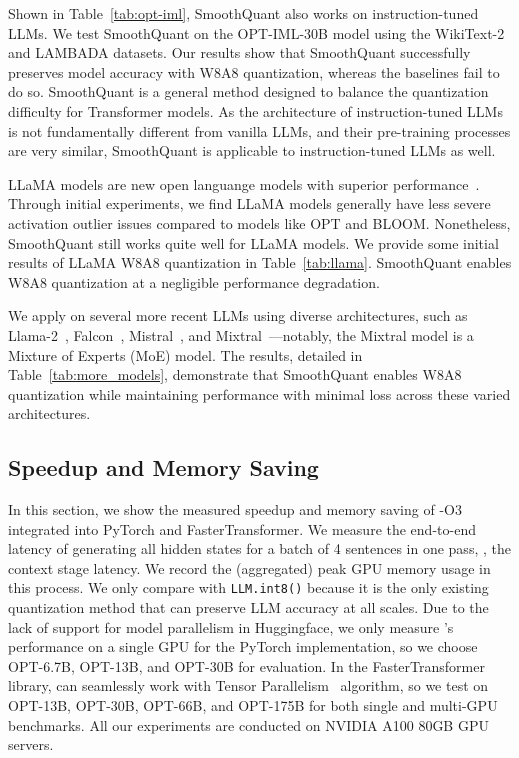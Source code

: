 
Shown in Table~\ref{tab:opt-iml}, SmoothQuant also works on instruction-tuned LLMs. We test SmoothQuant on the OPT-IML-30B model using the WikiText-2 and LAMBADA datasets. Our results show that SmoothQuant successfully preserves model accuracy with W8A8 quantization, whereas the baselines fail to do so. SmoothQuant is a general method designed to balance the quantization difficulty for Transformer models. As the architecture of instruction-tuned LLMs is not fundamentally different from vanilla LLMs, and their pre-training processes are very similar, SmoothQuant is applicable to instruction-tuned LLMs as well.


LLaMA models are new open languange models with superior performance~\cite{touvron2023llama}. Through initial experiments, we find LLaMA models generally have less severe activation outlier issues compared to models like OPT and BLOOM. Nonetheless, SmoothQuant still works quite well for LLaMA models. We provide some initial results of LLaMA W8A8 quantization in Table~\ref{tab:llama}. SmoothQuant enables W8A8 quantization at a negligible performance degradation. 


We apply \method on several more recent LLMs using diverse architectures, such as Llama-2~\cite{touvron2023llama2}, Falcon~\cite{almazrouei2023falcon}, Mistral~\cite{jiang2023mistral}, and Mixtral~\cite{jiang2024mixtral}—notably, the Mixtral model is a Mixture of Experts (MoE) model. The results, detailed in Table~\ref{tab:more_models}, demonstrate that SmoothQuant enables W8A8 quantization while maintaining performance with minimal loss across these varied architectures.

\subsection{Speedup and Memory Saving}
In this section, we show the measured speedup and memory saving of \method-O3 integrated into PyTorch and FasterTransformer.
We measure the end-to-end latency of generating all hidden states for a batch of 4 sentences in one pass, \ie, the context stage latency. We record the (aggregated) peak GPU memory usage in this process. We only compare \method with \texttt{LLM.int8()} because it is the only existing quantization method that can preserve LLM accuracy at all scales.
Due to the lack of support for model parallelism in Huggingface, we only measure \method's performance on a single GPU for the PyTorch implementation, so we choose OPT-6.7B, OPT-13B, and OPT-30B for evaluation. In the FasterTransformer library, \method can seamlessly work with Tensor Parallelism~\cite{megatron_lm} algorithm, so we test \method on OPT-13B, OPT-30B, OPT-66B, and OPT-175B for both single and multi-GPU benchmarks. All our experiments are conducted on NVIDIA A100 80GB GPU servers.

